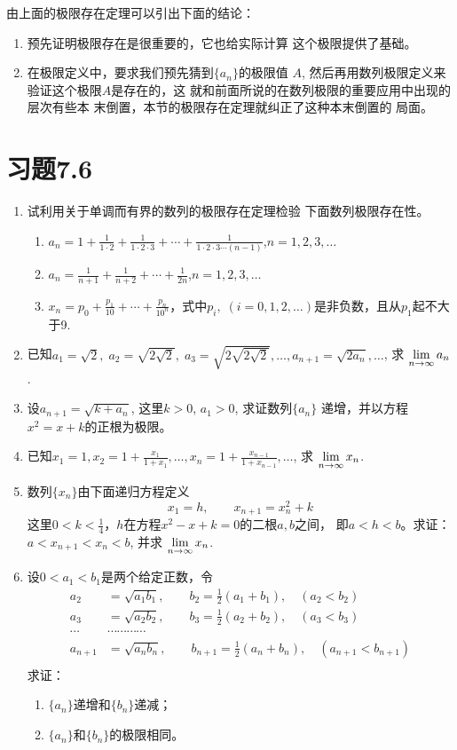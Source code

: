 由上面的极限存在定理可以引出下面的结论：
\begin{enumerate}
    \item 预先证明极限存在是很重要的，它也给实际计算
这个极限提供了基础。
\item 在极限定义中，要求我们预先猜到$\{a_n\}$的极限值
$A$, 然后再用数列极限定义来验证这个极限$A$是存在的，这
就和前面所说的在数列极限的重要应用中出现的层次有些本
末倒置，本节的极限存在定理就纠正了这种本末倒置的
局面。
\end{enumerate}

\section*{习题7.6}
\begin{enumerate}
    \item 试利用关于单调而有界的数列的极限存在定理检验
    下面数列极限存在性。
\begin{enumerate}
    \item $a_n=1+\frac{1}{1\cdot 2}+\frac{1}{1\cdot 2\cdot 3}+\cdots+\frac{1}{1\cdot 2\cdot 3\cdots (n-1)}$,\quad $n=1,2,3,\ldots$
    \item $a_n=\frac{1}{n+1}+\frac{1}{n+2}+\cdots +\frac{1}{2n}$,\quad $n=1,2,3,\ldots$
    \item $x_n=p_0+\frac{p_1}{10}+\cdots +\frac{p_n}{10^n}$，式中$p_i,\; (i=0,1,2,\ldots)$是非负数，且从$p_1$起不大于9.
\end{enumerate}
\item 已知$a_1=\sqrt{2},\; a_2=\sqrt{2\sqrt{2}},\; a_3=\sqrt{2\sqrt{2\sqrt{2}}},\ldots,a_{n+1}=\sqrt{2a_n},\ldots$, 求 $\displaystyle\lim_{n\to\infty}a_n$.
\item 设$a_{n+1}=\sqrt{k+a_n}$, 这里$k>0$, $a_1>0$, 求证数列$\{a_n\}$
递增，并以方程$x^2=x+k$的正根为极限。
\item 已知$x_1=1,x_2=1+\frac{x_1}{1+x_1},\ldots,x_n=1+\frac{x_{n-1}}{1+x_{n-1}},\ldots$, 求 $\displaystyle\lim_{n\to\infty}x_n$.

\item 数列$\{x_n\}$由下面递归方程定义
\[x_1=h,\qquad x_{n+1}=x_n^2+k\]
这里$0<k<\frac{1}{4}$，$h$在方程$x^2-x+k=0$的二根$a,b$之间，
即$a<h<b$。求证：$a<x_{n+1}<x_n<b$, 并求 $\displaystyle\lim_{n\to\infty}x_n$.

\item 设$0<a_1<b_1$是两个给定正数，令
\[\begin{split}
    a_2&=\sqrt{a_1b_1},\qquad b_2=\frac{1}{2}(a_1+b_1),\quad (a_2<b_2)\\
    a_3&=\sqrt{a_2b_2},\qquad b_3=\frac{1}{2}(a_2+ b_2),\quad (a_3<b_3)\\
\cdots &\cdots\cdots\cdots\cdots\\
    a_{n+1}&=\sqrt{a_nb_n},\qquad b_{n+1}=\frac{1}{2}(a_n+b_n),\quad (a_{n+1}<b_{n+1})\\
\end{split}\]
求证：
\begin{enumerate}
    \item $\{a_n\}$递增和$\{b_n\}$递减；
    \item $\{a_n\}$和$\{b_n\}$的极限相同。
\end{enumerate}
\end{enumerate}